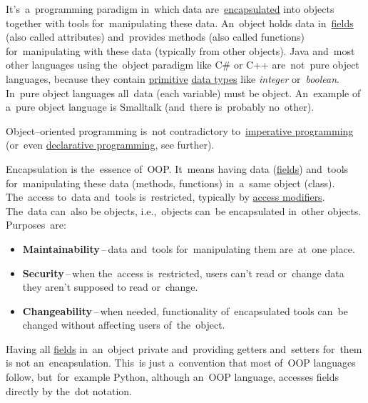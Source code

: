 
\label{objectorientedprogramming}
It's~a~programming paradigm in~which data are~\hyperref[encapsulation]{encapsulated} into objects together with tools for~manipulating these data. An~object holds data in~\hyperref[variablefieldproperty]{fields} (also called attributes) and~provides methods (also called functions) for~manipulating with these data (typically from other objects). Java and~most other languages using the~object paradigm like C\# or C++ are~not~pure object languages, because they contain \hyperref[javadatatypes]{primitive} \hyperref[datatypes]{data types} like \textit{integer} or~\textit{boolean}. In~pure object languages all~data (each variable) must be object. An~example of a~pure object language is Smalltalk (and~there is~probably no~other).

\warning Object--oriented programming is~not contradictory to~\hyperref[imperativeprogramming]{imperative programming} (or~even \hyperref[declarativeprogramming]{declarative programming}, see further).


\label{encapsulation}
Encapsulation is the~essence of~OOP. It~means having data (\hyperref[variablefieldproperty]{fields}) and~tools for~manipulating these data (methods, functions) in~a~same object (class). The~access to~data and~tools is~restricted, typically by \hyperref[javaaccessmodifiers]{access modifiers}. The~data can~also be objects, i.e.,~objects can~be encapsulated in~other objects. Purposes~are:
\begin{itemize}
    \item \textbf{Maintainability}\,--\,data and~tools for~manipulating them are~at~one place.
    \item \textbf{Security}\,--\,when the~access is~restricted, users can't read or~change data they aren't supposed to read or~change.
    \item \textbf{Changeability}\,--\,when needed, functionality of~encapsulated tools can~be changed without affecting users of~the~object.
\end{itemize}

\warning Having all \hyperref[variablefieldproperty]{fields} in~an~object private and~providing getters and~setters for~them is not an~encapsulation. This~is just a~convention that most of~OOP languages follow, but~for~example Python, although an~OOP language, accesses fields directly by the~dot notation.


